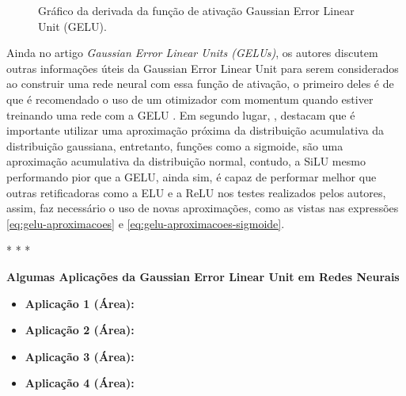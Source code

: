 \begin{figure}[htbp]
    \centering
    \caption{Gráfico da derivada da função de ativação Gaussian Error Linear Unit (GELU).}
    \label{fig:gelu-derivada}
\end{figure}

Ainda no artigo \textit{Gaussian Error Linear Units (GELUs)}, os autores discutem outras informações úteis da Gaussian Error Linear Unit para serem considerados ao construir uma rede neural com essa função de ativação, o primeiro deles é de que é recomendado o uso de um otimizador com momentum quando estiver treinando uma rede com a GELU \parencite{GELUArticle}. Em segundo lugar, \textcite{GELUArticle}, destacam que é importante utilizar uma aproximação próxima da distribuição acumulativa da distribuição gaussiana, entretanto, funções como a sigmoide, são uma aproximação acumulativa da distribuição normal, contudo, a SiLU mesmo performando pior que a GELU, ainda sim, é capaz de performar melhor que outras retificadoras como a ELU e a ReLU nos testes realizados pelos autores, assim, faz necessário o uso de novas aproximações, como as vistas nas expressões \ref{eq:gelu-aproximacoes} e \ref{eq:gelu-aproximacoes-sigmoide}.

\medskip
\begin{center}
 * * *
\end{center}
\medskip

\textbf{Algumas Aplicações da Gaussian Error Linear Unit em Redes Neurais}

\begin{itemize}
    \item \textbf{Aplicação 1 (Área):}
    \item \textbf{Aplicação 2 (Área):}
    \item \textbf{Aplicação 3 (Área):}
    \item \textbf{Aplicação 4 (Área):}
\end{itemize}

